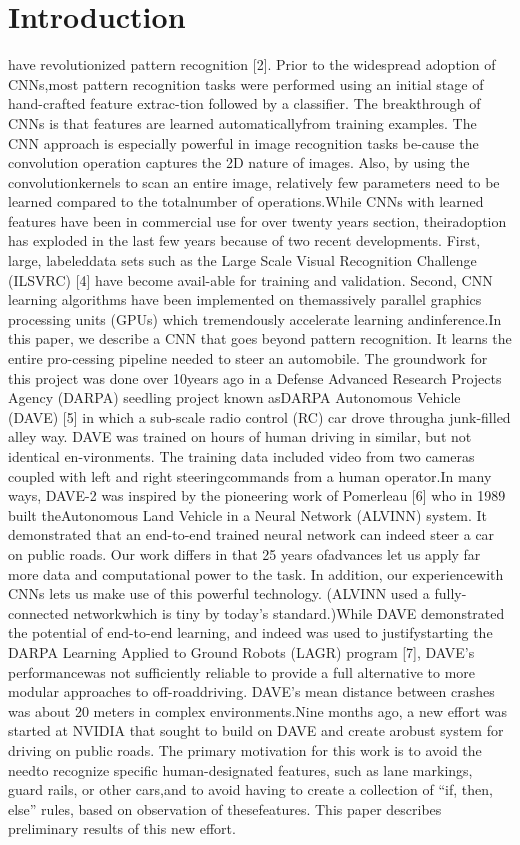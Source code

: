 \documentclass[a4paper]{article}
\begin{document}
		\section{Introduction}
		have revolutionized pattern recognition [2].  Prior to the widespread adoption of CNNs,most pattern recognition tasks were performed using an initial stage of hand-crafted feature extrac-tion followed by a classifier.  The breakthrough of CNNs is that features are learned automaticallyfrom training examples.  The CNN approach is especially powerful in image recognition tasks be-cause the convolution operation captures the 2D nature of images.  Also, by using the convolutionkernels to scan an entire image, relatively few parameters need to be learned compared to the totalnumber of operations.While CNNs with learned features have been in commercial use for over twenty years section,  theiradoption has exploded in the last few years because of two recent developments. First, large, labeleddata sets such as the Large Scale Visual Recognition Challenge (ILSVRC) [4] have become avail-able for training and validation.  Second, CNN learning algorithms have been implemented on themassively parallel graphics processing units (GPUs) which tremendously accelerate learning andinference.In this paper,  we describe a CNN that goes beyond pattern recognition.   It learns the entire pro-cessing pipeline needed to steer an automobile.  The groundwork for this project was done over 10years ago in a Defense Advanced Research Projects Agency (DARPA) seedling project known asDARPA Autonomous Vehicle (DAVE) [5] in which a sub-scale radio control (RC) car drove througha junk-filled alley way. DAVE was trained on hours of human driving in similar, but not identical en-vironments. The training data included video from two cameras coupled with left and right steeringcommands from a human operator.In many ways, DAVE-2 was inspired by the pioneering work of Pomerleau [6] who in 1989 built theAutonomous Land Vehicle in a Neural Network (ALVINN) system. It demonstrated that an end-to-end trained neural network can indeed steer a car on public roads. Our work differs in that 25 years ofadvances let us apply far more data and computational power to the task. In addition, our experiencewith CNNs lets us make use of this powerful technology. (ALVINN used a fully-connected networkwhich is tiny by today’s standard.)While  DAVE  demonstrated  the  potential  of  end-to-end  learning,  and  indeed  was  used  to  justifystarting the DARPA Learning Applied to Ground Robots (LAGR) program [7], DAVE’s performancewas not sufficiently reliable to provide a full alternative to more modular approaches to off-roaddriving. DAVE’s mean distance between crashes was about 20 meters in complex environments.Nine months ago, a new effort was started at NVIDIA that sought to build on DAVE and create arobust system for driving on public roads. The primary motivation for this work is to avoid the needto recognize specific human-designated features, such as lane markings, guard rails, or other cars,and to avoid having to create a collection of “if, then, else” rules, based on observation of thesefeatures. This paper describes preliminary results of this new effort.
\end{document}
